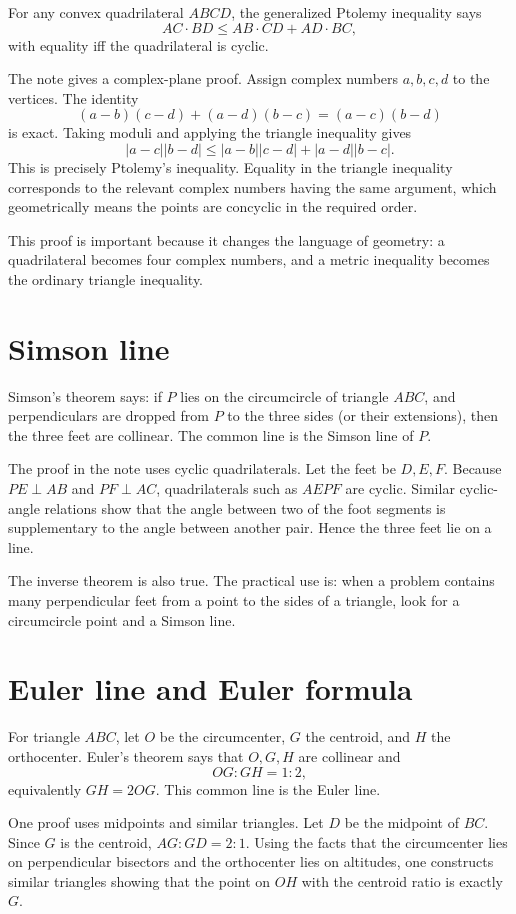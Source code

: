 For any convex quadrilateral $ABCD$, the generalized Ptolemy inequality says
\[
  AC\cdot BD\le AB\cdot CD+AD\cdot BC,
\]
with equality iff the quadrilateral is cyclic.

The note gives a complex-plane proof.  Assign complex numbers $a,b,c,d$ to the vertices.  The identity
\[
  (a-b)(c-d)+(a-d)(b-c)=(a-c)(b-d)
\]
is exact.  Taking moduli and applying the triangle inequality gives
\[
  |a-c||b-d|\le |a-b||c-d|+|a-d||b-c|.
\]
This is precisely Ptolemy's inequality.  Equality in the triangle inequality corresponds to the relevant complex numbers having the same argument, which geometrically means the points are concyclic in the required order.

This proof is important because it changes the language of geometry: a quadrilateral becomes four complex numbers, and a metric inequality becomes the ordinary triangle inequality.

\section{Simson line}

Simson's theorem says: if $P$ lies on the circumcircle of triangle $ABC$, and perpendiculars are dropped from $P$ to the three sides (or their extensions), then the three feet are collinear.  The common line is the Simson line of $P$.

The proof in the note uses cyclic quadrilaterals.  Let the feet be $D,E,F$.  Because $PE\perp AB$ and $PF\perp AC$, quadrilaterals such as $AEPF$ are cyclic.  Similar cyclic-angle relations show that the angle between two of the foot segments is supplementary to the angle between another pair.  Hence the three feet lie on a line.

The inverse theorem is also true.  The practical use is: when a problem contains many perpendicular feet from a point to the sides of a triangle, look for a circumcircle point and a Simson line.

\section{Euler line and Euler formula}

For triangle $ABC$, let $O$ be the circumcenter, $G$ the centroid, and $H$ the orthocenter.  Euler's theorem says that $O,G,H$ are collinear and
\[
  OG:GH=1:2,
\]
equivalently $GH=2OG$.  This common line is the Euler line.

One proof uses midpoints and similar triangles.  Let $D$ be the midpoint of $BC$.  Since $G$ is the centroid, $AG:GD=2:1$.  Using the facts that the circumcenter lies on perpendicular bisectors and the orthocenter lies on altitudes, one constructs similar triangles showing that the point on $OH$ with the centroid ratio is exactly $G$.

